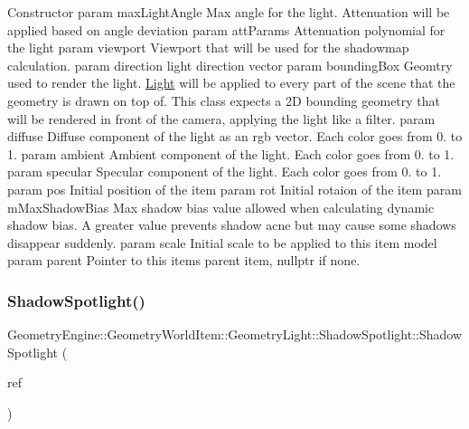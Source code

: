 Constructor param max\+Light\+Angle Max angle for the light. Attenuation will be applied based on angle deviation param att\+Params Attenuation polynomial for the light param viewport Viewport that will be used for the shadowmap calculation. param direction light direction vector param bounding\+Box Geomtry used to render the light. \mbox{\hyperlink{class_geometry_engine_1_1_geometry_world_item_1_1_geometry_light_1_1_light}{Light}} will be applied to every part of the scene that the geometry is drawn on top of. This class expects a 2D bounding geometry that will be rendered in front of the camera, applying the light like a filter. param diffuse Diffuse component of the light as an rgb vector. Each color goes from 0. to 1. param ambient Ambient component of the light. Each color goes from 0. to 1. param specular Specular component of the light. Each color goes from 0. to 1. param pos Initial position of the item param rot Initial rotaion of the item param m\+Max\+Shadow\+Bias Max shadow bias value allowed when calculating dynamic shadow bias. A greater value prevents shadow acne but may cause some shadows disappear suddenly. param scale Initial scale to be applied to this item model param parent Pointer to this items parent item, nullptr if none. \mbox{\label{class_geometry_engine_1_1_geometry_world_item_1_1_geometry_light_1_1_shadow_spotlight_a8757a401616b581827158f64eb176964}} 
\subsubsection{\texorpdfstring{ShadowSpotlight()}{ShadowSpotlight()}\hspace{0.1cm}{\footnotesize\ttfamily [2/2]}}
{\footnotesize\ttfamily Geometry\+Engine\+::\+Geometry\+World\+Item\+::\+Geometry\+Light\+::\+Shadow\+Spotlight\+::\+Shadow\+Spotlight (\begin{DoxyParamCaption}\item[{const \mbox{\hyperlink{class_geometry_engine_1_1_geometry_world_item_1_1_geometry_light_1_1_shadow_spotlight}{Shadow\+Spotlight}} \&}]{ref }\end{DoxyParamCaption})\hspace{0.3cm}{\ttfamily [inline]}}

